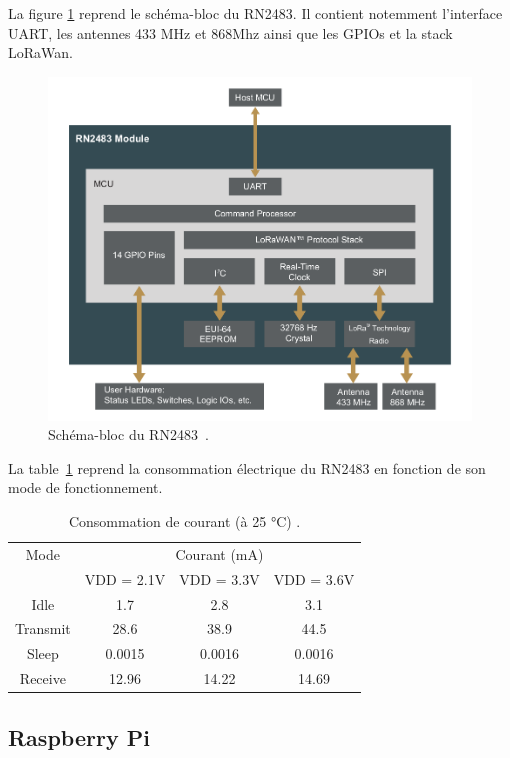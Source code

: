     La figure \ref{fig:state-rn2484-block} reprend le schéma-bloc du RN2483. Il contient notemment l'interface UART, les antennes 433 MHz et 868Mhz ainsi que les GPIOs et la stack LoRaWan.
    \begin{figure}[H]
        \centering
        \includegraphics[scale=0.4]{res/rn2483-block-diagram.png}
        \caption{Schéma-bloc du RN2483~\cite{rn2483:datasheet}.}
        \label{fig:state-rn2484-block}
    \end{figure}
    La table~\ref{tb:state-rn2483-consumption} reprend la consommation électrique du RN2483 en fonction de son mode de fonctionnement.
    \begin{table}[H]
        \centering
        \begin{tabular}{| *{4}{c|} }
            \hline
            Mode & \multicolumn{3}{c|}{\multirow{1}{*}{Courant (mA)}}\\ \cline{2-4}
             & VDD = 2.1V & VDD = 3.3V  & VDD = 3.6V \\ \hhline{|=|=|=|=|}
            Idle & 1.7 & 2.8 & 3.1 \\ \hline
            Transmit & 28.6 & 38.9 & 44.5 \\ \hline
            Sleep & 0.0015 & 0.0016 & 0.0016 \\ \hline
            Receive & 12.96 & 14.22 & 14.69 \\ \hline
        \end{tabular}
        \caption{Consommation de courant (à 25 °C) \cite{rn2483:datasheet}.}
        \label{tb:state-rn2483-consumption}
    \end{table}

\subsection*{Raspberry Pi}

